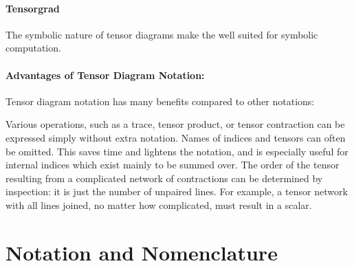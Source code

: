 \documentclass[oneside]{book}
\begin{document}
\paragraph{Tensorgrad}
The symbolic nature of tensor diagrams make the well suited for symbolic computation.

\paragraph{Advantages of Tensor Diagram Notation:}
Tensor diagram notation has many benefits compared to other notations:

Various operations, such as a trace, tensor product, or tensor contraction can be expressed simply without extra notation.
Names of indices and tensors can often be omitted. This saves time and lightens the notation, and is especially useful for internal indices which exist mainly to be summed over.
The order of the tensor resulting from a complicated network of contractions can be determined by inspection: it is just the number of unpaired lines. For example, a tensor network with all lines joined, no matter how complicated, must result in a scalar.

\tableofcontents

\section{Notation and Nomenclature}

\newenvironment{compress}{
  \renewcommand{\arraystretch}{0.6} %
  \setlength{\arraycolsep}{2pt}     %
  \vspace{.3em}
}{
  \vspace{.3em}
  \renewcommand{\arraystretch}{1}   %
  \setlength{\arraycolsep}{5pt}     %
}
\end{document}
